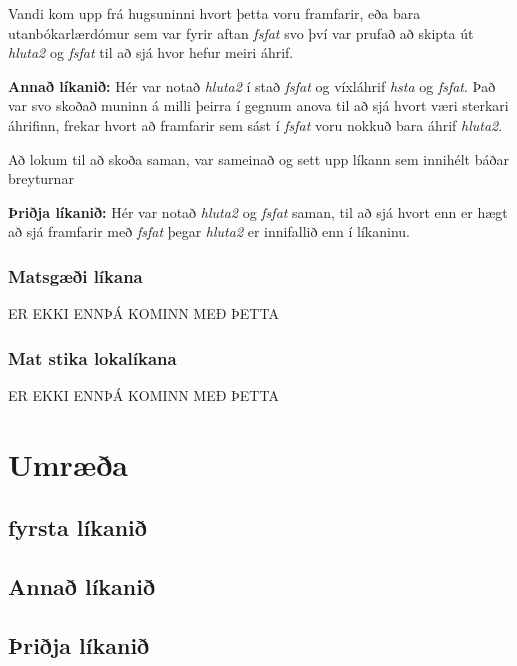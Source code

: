 \documentclass[
  12pt,
]{article}
\begin{document}
Vandi kom upp frá hugsuninni hvort þetta voru framfarir, eða bara utanbókarlærdómur sem var fyrir aftan \emph{fsfat} svo því var prufað að skipta út \emph{hluta2} og \emph{fsfat} til að sjá hvor hefur meiri áhrif.

\textbf{Annað líkanið:} Hér var notað \emph{hluta2} í stað \emph{fsfat} og víxláhrif \emph{hsta} og \emph{fsfat}. Það var svo skoðað muninn á milli þeirra í gegnum anova til að sjá hvort væri sterkari áhrifinn, frekar hvort að framfarir sem sást í \emph{fsfat} voru nokkuð bara áhrif \emph{hluta2}.

Að lokum til að skoða saman, var sameinað og sett upp líkann sem innihélt báðar breyturnar

\textbf{Þriðja líkanið:} Hér var notað \emph{hluta2} og \emph{fsfat} saman, til að sjá hvort enn er hægt að sjá framfarir með \emph{fsfat} þegar \emph{hluta2} er innifallið enn í líkaninu.

\hypertarget{matsguxe6uxf0i-luxedkana}{%
\subsubsection{Matsgæði líkana}\label{matsguxe6uxf0i-luxedkana}}

ER EKKI ENNÞÁ KOMINN MEÐ ÞETTA

\hypertarget{mat-stika-lokaluxedkana}{%
\subsubsection{Mat stika lokalíkana}\label{mat-stika-lokaluxedkana}}

ER EKKI ENNÞÁ KOMINN MEÐ ÞETTA

\hypertarget{umruxe6uxf0a}{%
\section{Umræða}\label{umruxe6uxf0a}}

\hypertarget{fyrsta-luxedkaniuxf0}{%
\subsection{fyrsta líkanið}\label{fyrsta-luxedkaniuxf0}}

\hypertarget{annauxf0-luxedkaniuxf0}{%
\subsection{Annað líkanið}\label{annauxf0-luxedkaniuxf0}}

\hypertarget{uxferiuxf0ja-luxedkaniuxf0}{%
\subsection{Þriðja líkanið}\label{uxferiuxf0ja-luxedkaniuxf0}}
\end{document}
